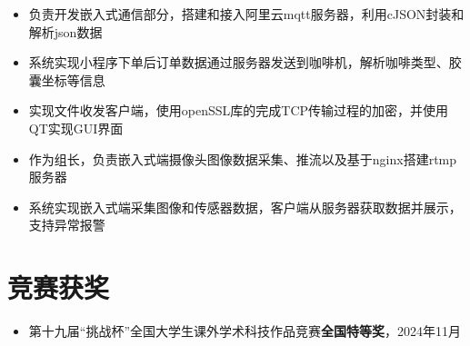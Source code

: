 \documentclass{resume}
\begin{document}

\begin{itemize}
    \item 负责开发嵌入式通信部分，搭建和接入阿里云mqtt服务器，利用cJSON封装和解析json数据
    \item 系统实现小程序下单后订单数据通过服务器发送到咖啡机，解析咖啡类型、胶囊坐标等信息
\end{itemize}

\begin{itemize}
    \item 实现文件收发客户端，使用openSSL库的完成TCP传输过程的加密，并使用QT实现GUI界面
\end{itemize}

\begin{itemize}
    \item 作为组长，负责嵌入式端摄像头图像数据采集、推流以及基于nginx搭建rtmp服务器
    \item 系统实现嵌入式端采集图像和传感器数据，客户端从服务器获取数据并展示，支持异常报警
    
\end{itemize}

\section{竞赛获奖}
\begin{itemize}[parsep=0.2ex]
  \item 第十九届“挑战杯”全国大学生课外学术科技作品竞赛\textbf{全国特等奖}，2024年11月
\end{itemize}

%
%
\end{document}
